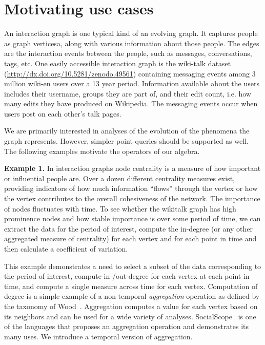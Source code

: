 \section{Motivating use cases}
\label{sec:cases}

An interaction graph is one typical kind of an evolving graph.  It
captures people as graph verticesa, along with various information
about those people.  The edges are the interaction events between the
people, such as messages, conversations, tags, etc.  One easily
accessible interaction graph is the wiki-talk dataset
(\url{http://dx.doi.org/10.5281/zenodo.49561}) containing messaging
events among 3 million wiki-en users over a 13 year period.
Information available about the users includes their username, groups
they are part of, and their edit count, i.e. how many edits they have
produced on Wikipedia.  The messaging events occur when users post on
each other's talk pages.

We are primarily interested in analyses of the evolution of the
phenomena the graph represents.  However, simpler point queries should
be supported as well.  The following examples motivate the operators
of our algebra.

{\bf Example 1.}  In interaction graphs node centrality is a measure
of how important or influential people are.  Over a dozen different
centrality measures exist, providing indicators of how much
information ``flows'' through the vertex or how the vertex contributes
to the overall cohesiveness of the network.  The importance of nodes
fluctuates with time.  To see whether the wikitalk graph has high
prominence nodes and how stable importance is over some period of
time, we can extract the data for the period of interest, compute the
in-degree (or any other aggregated measure of centrality) for each
vertex and for each point in time and then calculate a coefficient of
variation.

This example demonstrates a need to select a subset of the data
corresponding to the period of interest, compute in-/out-degree for
each vertex at each point in time, and compute a single measure across
time for each vertex.  Computation of degree is a simple example of a
non-temporal {\em aggregation} operation as defined by the taxonomy of
Wood~\cite{Wood2012}.  Aggregation computes a value for each vertex
based on its neighbors and can be used for a wide variety of analyses.
SocialScope~\cite{Amer-Yahia2009} is one of the languages that proposes
an aggregation operation and demonstrates its many uses.  We introduce
a temporal version of aggregation.

